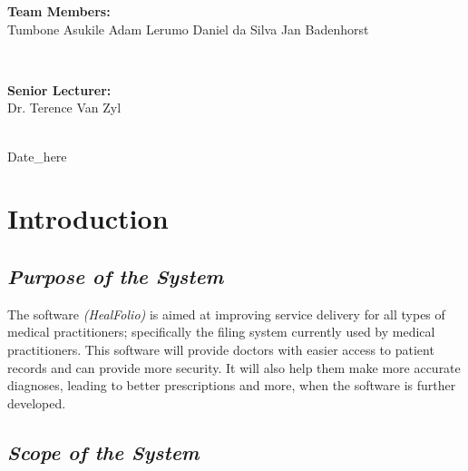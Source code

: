 \documentclass[a4paper]{article}
\begin{document}
\begin{titlepage}
\begin{minipage}{0.4\textwidth}
\begin{flushleft}
\textbf{Team Members:} \\[0.3cm]

Tumbone Asukile\newline
Adam Lerumo\newline
Daniel da Silva\newline
Jan Badenhorst\newline

\end{flushleft}

\end{minipage} \\[0.7cm]

\begin{minipage}{0.4\textwidth}

\begin{flushright} \large

\textbf{Senior Lecturer:} \\[0.3cm]

Dr. Terence Van Zyl

\end{flushright}

\end{minipage} \\[1cm]

{\large Date\_here} 
    
\end{titlepage}

\setlength\parindent{24pt}

\newpage

\section{Introduction}

\subsection{\textit{Purpose of the System}}

The software \emph{(HealFolio)} is aimed at improving service delivery for all types of medical practitioners; specifically the filing system currently used by medical practitioners. This software will provide doctors with easier access to patient records and can provide more security. It will also help them make more accurate diagnoses, leading to better prescriptions and more, when the software is further developed. 
		
\subsection{\textit{Scope of the System}}
\end{document}
